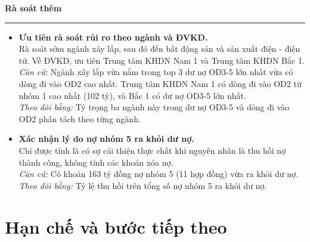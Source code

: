 \documentclass[12pt]{eDA_conquer2026}
\begin{document}
\vspace{0.3cm}
\textbf{Rà soát thêm}
\vspace{0.1cm}
\hrule
\vspace{0.3cm}

\begin{itemize}[label=--, leftmargin=0.8cm]

    \item \textbf{Ưu tiên rà soát rủi ro theo ngành và ĐVKD.}\\
    Rà soát sớm ngành xây lắp, sau đó đến bất động sản và sản xuất điện - điện tử. Về ĐVKD, ưu tiên Trung tâm KHDN Nam 1 và Trung tâm KHDN Bắc 1.\\
    \textit{Căn cứ:} Ngành xây lắp vừa nằm trong top 3 dư nợ OD3-5 lớn nhất vừa có dòng đi vào OD2 cao nhất. Trung tâm KHDN Nam 1 có dòng đi vào OD2 từ nhóm 1 cao nhất (102 tỷ), và Bắc 1 có dư nợ OD3-5 lớn nhất.\\
    \textit{Theo dõi bằng:} Tỷ trọng ba ngành này trong dư nợ OD3-5 và dòng đi vào OD2 phân tách theo từng ngành.

    \item \textbf{Xác nhận lý do nợ nhóm 5 ra khỏi dư nợ.}\\
    Chỉ được tính là có sự cải thiện thực chất khi nguyên nhân là thu hồi nợ thành công, không tính các khoản xóa nợ.\\
    \textit{Căn cứ:} Có khoản 163 tỷ đồng nợ nhóm 5 (11 hợp đồng) vừa ra khỏi dư nợ.\\
    \textit{Theo dõi bằng:} Tỷ lệ thu hồi trên tổng số nợ nhóm 5 ra khỏi dư nợ.

\end{itemize}

\section{Hạn chế và bước tiếp theo}
\end{document}

